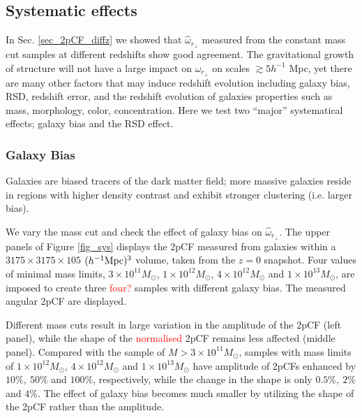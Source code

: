 \documentclass[iop]{emulateapj}
\newcommand{\scr}{\textcolor{red}}
\begin{document}
\subsection{Systematic effects}


In Sec. \ref{sec_2pCF_diffz} we showed that $\hat \omega_{r_\perp}$ measured from the
constant mass cut samples at different redshifts show good agreement.
The gravitational growth of structure will not have a large impact on $\hat \omega_{r_\perp}$ on scales $\gtrsim5 h^{-1}$ Mpc,
yet there are many other factors that may induce redshift evolution
including galaxy bias, RSD, redshift error, and 
the redshift evolution of galaxies properties 
such as mass, morphology, color, concentration. 
Here we test two ``major'' systematical effects; galaxy bias and the RSD effect.



\subsubsection{Galaxy Bias}

Galaxies are biased tracers of the dark matter field;
more massive galaxies reside in regions with higher density contrast
and exhibit stronger clustering (i.e. larger bias).

We vary the mass cut and check the effect of galaxy bias on $\hat \omega_{r_\perp}$.
The upper panels of Figure \ref{fig_sys} displays the 2pCF measured from galaxies within a $3175\times3175\times105$ $(h^{-1}\rm Mpc)^3$ volume, taken from the $z=0$ snapshot.
Four values of minimal mass limits, $3\times 10^{11} M_{\odot}$, $1\times 10^{12} M_{\odot}$, $4\times 10^{12} M_{\odot}$ and $1\times 10^{13} M_{\odot}$,
are imposed to create three \scr{four?} samples with different galaxy bias.
The measured angular 2pCF are displayed.

Different mass cuts result in large variation in the amplitude of the 2pCF (left panel),
while the shape of the \scr{normalised} 2pCF remains less affected (middle panel).
Compared with the sample of $M>3\times 10^{11} M_{\odot}$,
samples with mass limits of $1\times 10^{12} M_{\odot}$, $4\times 10^{12} M_{\odot}$ and $1\times 10^{13} M_{\odot}$
have amplitude of 2pCFs enhanced by $10\%,\ 50\%$ and $100\%$, respectively, 
while the change in the shape is only $0.5\%,\ 2\%$ and $4\%$.
The effect of galaxy bias becomes much smaller by utilizing the shape of the 2pCF rather than the amplitude.
\end{document}
